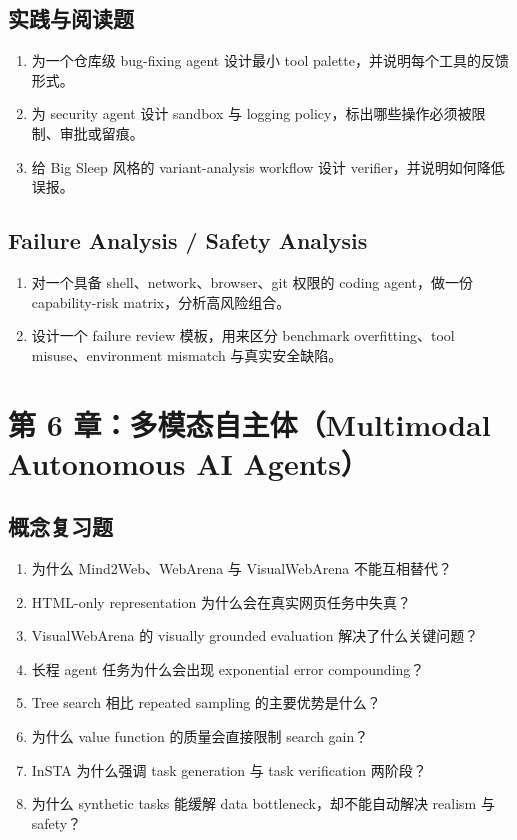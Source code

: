 \subsection*{实践与阅读题}
\begin{enumerate}
\item 为一个仓库级 bug-fixing agent 设计最小 tool palette，并说明每个工具的反馈形式。
\item 为 security agent 设计 sandbox 与 logging policy，标出哪些操作必须被限制、审批或留痕。
\item 给 Big Sleep 风格的 variant-analysis workflow 设计 verifier，并说明如何降低误报。
\end{enumerate}

\subsection*{Failure Analysis / Safety Analysis}
\begin{enumerate}
\item 对一个具备 shell、network、browser、git 权限的 coding agent，做一份 capability-risk matrix，分析高风险组合。
\item 设计一个 failure review 模板，用来区分 benchmark overfitting、tool misuse、environment mismatch 与真实安全缺陷。
\end{enumerate}

\section{第 6 章：多模态自主体（Multimodal Autonomous AI Agents）}

\subsection*{概念复习题}
\begin{enumerate}
\item 为什么 Mind2Web、WebArena 与 VisualWebArena 不能互相替代？
\item HTML-only representation 为什么会在真实网页任务中失真？
\item VisualWebArena 的 visually grounded evaluation 解决了什么关键问题？
\item 长程 agent 任务为什么会出现 exponential error compounding？
\item Tree search 相比 repeated sampling 的主要优势是什么？
\item 为什么 value function 的质量会直接限制 search gain？
\item InSTA 为什么强调 task generation 与 task verification 两阶段？
\item 为什么 synthetic tasks 能缓解 data bottleneck，却不能自动解决 realism 与 safety？
\end{enumerate}

